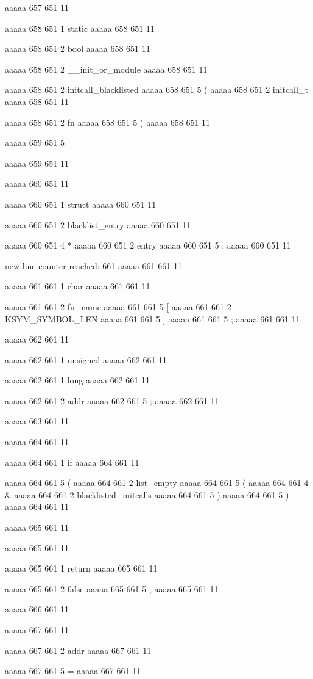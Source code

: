 aaaaa 657 651
11


aaaaa 658 651
1
static
aaaaa 658 651
11
 
aaaaa 658 651
2
bool
aaaaa 658 651
11
 
aaaaa 658 651
2
__init_or_module
aaaaa 658 651
11
 
aaaaa 658 651
2
initcall_blacklisted
aaaaa 658 651
5
(
aaaaa 658 651
2
initcall_t
aaaaa 658 651
11
 
aaaaa 658 651
2
fn
aaaaa 658 651
5
)
aaaaa 658 651
11


aaaaa 659 651
5
{
aaaaa 659 651
11


aaaaa 660 651
11
	
aaaaa 660 651
1
struct
aaaaa 660 651
11
 
aaaaa 660 651
2
blacklist_entry
aaaaa 660 651
11
 
aaaaa 660 651
4
*
aaaaa 660 651
2
entry
aaaaa 660 651
5
;
aaaaa 660 651
11


new line counter reached: 661
aaaaa 661 661
11
	
aaaaa 661 661
1
char
aaaaa 661 661
11
 
aaaaa 661 661
2
fn_name
aaaaa 661 661
5
[
aaaaa 661 661
2
KSYM_SYMBOL_LEN
aaaaa 661 661
5
]
aaaaa 661 661
5
;
aaaaa 661 661
11


aaaaa 662 661
11
	
aaaaa 662 661
1
unsigned
aaaaa 662 661
11
 
aaaaa 662 661
1
long
aaaaa 662 661
11
 
aaaaa 662 661
2
addr
aaaaa 662 661
5
;
aaaaa 662 661
11


aaaaa 663 661
11


aaaaa 664 661
11
	
aaaaa 664 661
1
if
aaaaa 664 661
11
 
aaaaa 664 661
5
(
aaaaa 664 661
2
list_empty
aaaaa 664 661
5
(
aaaaa 664 661
4
&
aaaaa 664 661
2
blacklisted_initcalls
aaaaa 664 661
5
)
aaaaa 664 661
5
)
aaaaa 664 661
11


aaaaa 665 661
11
	
aaaaa 665 661
11
	
aaaaa 665 661
1
return
aaaaa 665 661
11
 
aaaaa 665 661
2
false
aaaaa 665 661
5
;
aaaaa 665 661
11


aaaaa 666 661
11


aaaaa 667 661
11
	
aaaaa 667 661
2
addr
aaaaa 667 661
11
 
aaaaa 667 661
5
=
aaaaa 667 661
11
 
}
